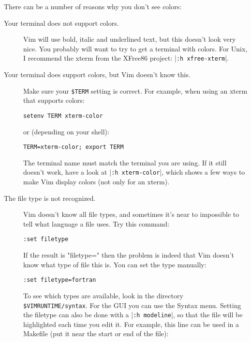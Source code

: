 There can be a number of reasons why you don't see colors:
\begin{description}
				\item [Your terminal does not support colors.]
								Vim will use bold, italic and underlined text, but this doesn't look very nice.
								You probably will want to try to get a terminal with colors.
								For Unix, I recommend the xterm from the XFree86 project: |\texttt{:h xfree-xterm}|.

				\item [Your terminal does support colors, but Vim doesn't know this.]
								Make sure your \texttt{\$TERM} setting is correct.  For example, when using an
								xterm that supports colors:

								\begin{Verbatim}[samepage=true]
		 setenv TERM xterm-color
								\end{Verbatim}

								or (depending on your shell):

								\begin{Verbatim}[samepage=true]
		 TERM=xterm-color; export TERM
								\end{Verbatim}

								The terminal name must match the terminal you are using.
								If it still doesn't work, have a look at |\texttt{:h xterm-color}|, which shows a few ways to make Vim display colors (not only for an xterm).

				\item [The file type is not recognized.]
								Vim doesn't know all file types, and sometimes it's near to impossible
								to tell what language a file uses.  Try this command:

								\begin{Verbatim}[samepage=true]
		 :set filetype
								\end{Verbatim}

								If the result is "filetype=" then the problem is indeed that Vim doesn't know what type of file this is.
								You can set the type manually:

								\begin{Verbatim}[samepage=true]
		 :set filetype=fortran
												\end{Verbatim}

								To see which types are available, look in the directory \texttt{\$VIMRUNTIME/syntax}.
								For the GUI you can use the Syntax menu.
								Setting the filetype can also be done with a |\texttt{:h modeline}|, so that the file will be highlighted each time you edit it.
								For example, this line can be used in a Makefile (put it near the start or end of the file):


\end{description}
